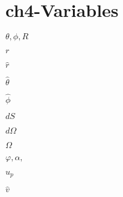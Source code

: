 \section{ch4-Variables}

\noindent $\theta, \phi, R$ \newline

\noindent $r$ \newline

\noindent $\hat{r}$ \newline

\noindent $\hat{\theta}$ \newline

\noindent $\hat{\phi}$ \newline

\noindent $dS$ \newline

\noindent $d\Omega$ \newline

\noindent $\Omega$ \newline

\noindent $\varphi, \alpha,$  \newline

\noindent $u_p$ \newline

\noindent $\hat{v}$ \newline